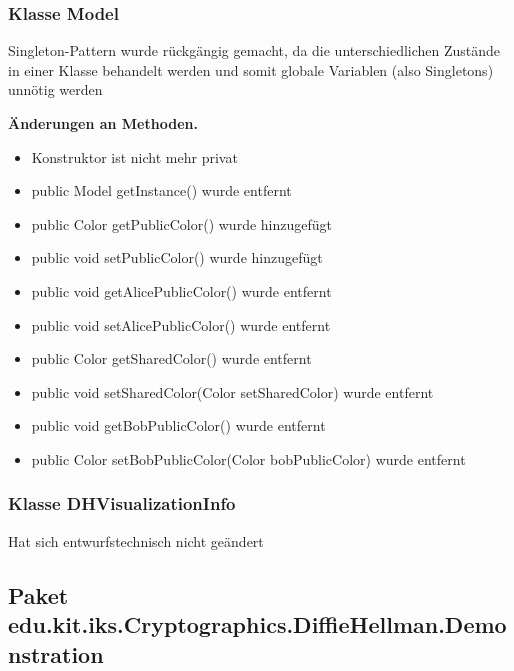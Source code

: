 \documentclass{article}
\begin{document}
  	\subsubsection{Klasse Model}
    Singleton-Pattern wurde rückgängig gemacht, da die unterschiedlichen Zustände
    in einer Klasse behandelt werden und somit globale Variablen (also Singletons)
    unnötig werden

    \textbf{Änderungen an Methoden.}\newline
	   \begin{itemize}
           \item Konstruktor ist nicht mehr privat\newline
           \item public Model getInstance() wurde entfernt\newline
           \item public Color getPublicColor() wurde hinzugefügt\newline
           \item public void setPublicColor() wurde hinzugefügt\newline
           \item public void getAlicePublicColor() wurde entfernt\newline
           \item public void setAlicePublicColor() wurde entfernt\newline
           \item public Color getSharedColor() wurde entfernt\newline
           \item public void setSharedColor(Color setSharedColor) wurde entfernt\newline
           \item public void getBobPublicColor() wurde entfernt\newline
           \item public Color setBobPublicColor(Color bobPublicColor) wurde entfernt\newline
           \end{itemize}

	\subsubsection{Klasse DHVisualizationInfo}
    Hat sich entwurfstechnisch nicht geändert

  \subsection{Paket edu.kit.iks.Cryptographics.DiffieHellman.Demonstration}
\end{document}
